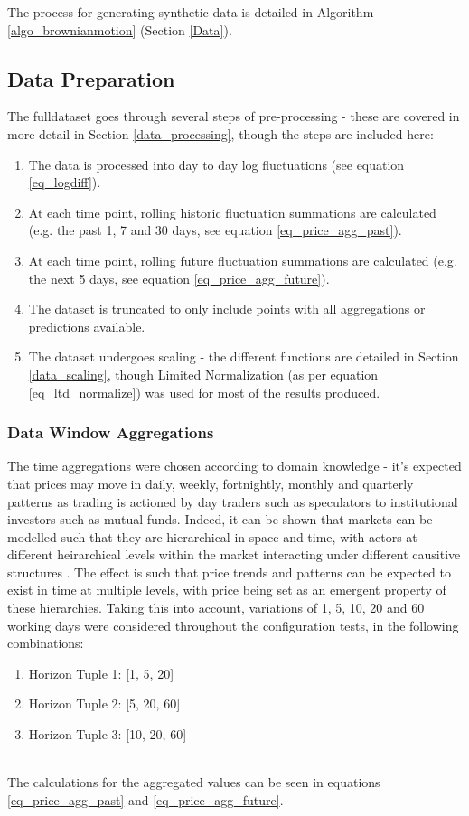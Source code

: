 \documentclass[a4paper,11pt,oneside]{article}
\theoremstyle{plain}
\theoremstyle{definition}
\begin{document}
	The process for generating synthetic data is detailed in Algorithm \ref{algo_brownianmotion} (Section \ref{Data}).
	
	\subsection{Data Preparation}\label{proc_dataprep}
	
	The fulldataset goes through several steps of pre-processing - these are covered in more detail in Section \ref{data_processing}, though the steps are included here:
	
	\begin{enumerate}
		\item The data is processed into day to day log fluctuations (see equation \eqref{eq_logdiff}).
		\item At each time point, rolling historic fluctuation summations are calculated (e.g. the past 1, 7 and 30 days, see equation \eqref{eq_price_agg_past}).
		\item At each time point, rolling future fluctuation summations are calculated (e.g. the next 5 days, see equation \eqref{eq_price_agg_future}).
		\item The dataset is truncated to only include points with all aggregations or predictions available.
		\item The dataset undergoes scaling - the different functions are detailed in Section \ref{data_scaling}, though Limited Normalization (as per equation \eqref{eq_ltd_normalize}) was used for most of the results produced.
	\end{enumerate}
	
	\subsubsection{Data Window Aggregations} The time aggregations were chosen according to domain knowledge - it's expected that prices may move in daily, weekly, fortnightly, monthly and quarterly patterns as trading is actioned by day traders such as speculators to institutional investors such as mutual funds. Indeed, it can be shown that markets can be modelled such that they are hierarchical in space and time, with actors at different heirarchical levels within the market interacting under different causitive structures \citep{Wilcox}. The effect is such that price trends and patterns can be expected to exist in time at multiple levels, with price being set as an emergent property of these hierarchies. Taking this into account, variations of 1, 5, 10, 20 and 60 working days were considered throughout the configuration tests, in the following combinations:  
	\begin{enumerate}
		\item Horizon Tuple 1: [1, 5, 20]
		\item Horizon Tuple 2: [5, 20, 60]
		\item Horizon Tuple 3: [10, 20, 60]
	\end{enumerate}
	~\\
	The calculations for the aggregated values can be seen in equations \eqref{eq_price_agg_past} and \eqref{eq_price_agg_future}.
	
\end{document}
